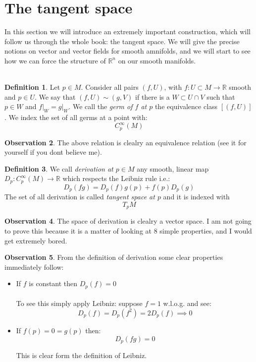 \documentclass[12pt,a4paper]{report}
\theoremstyle{definition}
\newtheorem{Def}{Definition}[chapter]
\theoremstyle{Theorem}
\theoremstyle{definition}
\theoremstyle{definition}
\newtheorem{Obs}[Def]{Observation}
\begin{document}
			\section{The tangent space}
			In this section we will introduce an extremely important construction, which will follow us through the whole book: the tangent space. We will give the precise notions on vector and vector fields for smooth amnifolds, and we will start to see how we can force the structure of $\mathbb{R}^n$ on our smooth manifolds.
			\\\\
			\begin{Def}
				Let $p\in M$. Consider all pairs $(f,U)$, with $f:U\subset M\rightarrow \mathbb{R}$ smooth and $p\in U$. We say that $(f,U)\sim (g,V)$ if there is a $W\subset U\cap V$ such that $p\in W$ and $f\big|_W=g\big|_W$.
				We call the \textit{germ of $f$ at $p$} the equivalence class $[(f,U)]$. We index the set of all germs at a point with:
				$$C^\infty_p(M)$$
			\end{Def}
			\begin{Obs}
				The above relation is clealry an equivalence relation (see it for yourself if you dont believe me).
			\end{Obs}
			\begin{Def}
				We call \textit{derivation at $p\in M$} any smooth, linear map $D_p:C_p^\infty(M)\rightarrow \mathbb{R}$ which respects the Leibniz rule i.e.:
				$$D_p(fg)=D_p(f)g(p)+f(p)D_p(g)$$
				The set of all derivation is called \textit{tangent space at $p$} and it is indexed with $$T_pM$$
			\end{Def}
			\begin{Obs}
				The space of derivation is clealry a vector space. I am not going to prove this because it is a matter of looking at 8 simple properties, and I would get extremely bored.
			\end{Obs}
			\begin{Obs}
				From the definition of derivation some clear properties immediately follow:
				\begin{itemize}
					\item If $f$ is constant then $D_p(f)=0$
					\\\\
					To see this simply apply Leibniz: suppose $f=1$ w.l.o.g. and see:
					$$D_p(f)=D_p(f^2)=2D_p(f)\implies 0$$
					\item  If $f(p)=0=g(p)$ then:
					$$D_p(fg)=0$$
					
					This is clear form the definition of Leibniz.
				\end{itemize}
			\end{Obs}
\end{document}
